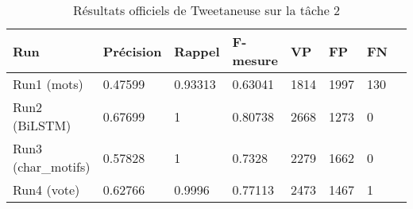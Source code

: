 \begin{table}
\begin{tabular}{l|l|l|l|l|l|l|l}
Run		& Précision	& Rappel& F-mesure	& VP 	&FP 	&FN\\
\hline
\hline
Run1 (mots)   	&0.47599 	&0.93313 	&0.63041	&1814	&1997	&130\\
Run2 (BiLSTM) 	&0.67699	&1		&0.80738	&2668	&1273	&0\\
Run3 (char\_motifs) 	&0.57828&1  		&0.7328 	&2279	&1662	&0\\
Run4 (vote) 	&0.62766  	&0.9996  	&0.77113 	&2473	&1467	&1\\
\hline


\end{tabular}
\caption{Résultats officiels de Tweetaneuse sur la tâche 2}
\end{table}
